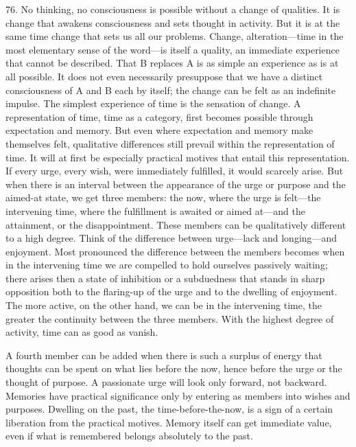 \documentclass[12pt,a4paper]{book}
\newcommand{\opage}[1]{\marginnote{\footnotesize\textit{[#1]}}}
\begin{document}
76. No thinking, no consciousness is possible without a change of
qualities. It is change that awakens consciousness and sets thought in
activity. But it is at the same time change that sets us all our problems.
Change, alteration---time in the most elementary sense of the word---is
itself a quality, an immediate experience that cannot be described. That B
replaces A is as simple an experience as is at all possible. It does not even
necessarily presuppose that we have a distinct consciousness of A and B each
by itself; the change can be felt as an indefinite impulse. The simplest
experience of time is the sensation of change. A representation of time, time
as a category, first becomes possible through expectation and memory. But
even where expectation and memory make themselves felt, qualitative
differences still prevail \opage{187}within the representation of time. It will at first
be especially practical motives that entail this representation. If every
urge, every wish, were immediately fulfilled, it would scarcely arise. But
when there is an interval between the appearance of the urge or purpose and
the aimed-at state, we get three members: the now, where the urge is
felt---the intervening time, where the fulfillment is awaited or aimed
at---and the attainment, or the disappointment. These members can be
qualitatively different to a high degree. Think of the difference between
urge---lack and longing---and enjoyment. Most pronounced the difference
between the members becomes when in the intervening time we are compelled to
hold ourselves passively waiting; there arises then a state of inhibition or
a subduedness that stands in sharp opposition both to the flaring-up of the
urge and to the dwelling of enjoyment. The more active, on the other hand, we
can be in the intervening time, the greater the continuity between the three
members. With the highest degree of activity, time can as good as vanish.

A fourth member can be added when there is such a surplus of energy that
thoughts can be spent on what lies before the now, hence before the urge or
the thought of purpose. A passionate urge will look only forward, not
backward. Memories have practical significance only by entering as members
into wishes and purposes. Dwelling on the past, the time-before-the-now, is a
sign of a certain liberation from the practical motives. Memory itself can
get immediate value, even if what is remembered belongs absolutely to the
past.
\end{document}
